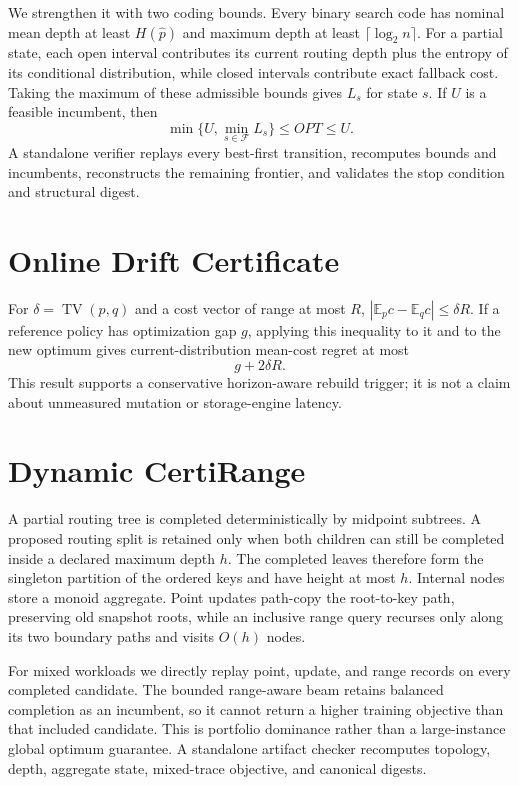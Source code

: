 \documentclass[10pt]{article}
\begin{document}
We strengthen it with two coding bounds. Every binary search code has nominal
mean depth at least $H(\hat p)$ and maximum depth at least
$\lceil\log_2 n\rceil$. For a partial state, each open interval contributes
its current routing depth plus the entropy of its conditional distribution,
while closed intervals contribute exact fallback cost. Taking the maximum of
these admissible bounds gives $L_s$ for state $s$. If $U$ is a feasible
incumbent, then
\[
\min\{U,\min_{s\in\mathcal F}L_s\}\leq OPT\leq U.
\]
A standalone verifier replays every best-first transition, recomputes bounds
and incumbents, reconstructs the remaining frontier, and validates the stop
condition and structural digest.

\section{Online Drift Certificate}
For $\delta=\operatorname{TV}(p,q)$ and a cost vector of range at most $R$,
$|\mathbb E_p c-\mathbb E_q c|\leq\delta R$. If a reference policy has
optimization gap $g$, applying this inequality to it and to the new optimum
gives current-distribution mean-cost regret at most
\[
g+2\delta R.
\]
This result supports a conservative horizon-aware rebuild trigger; it is not a
claim about unmeasured mutation or storage-engine latency.

\section{Dynamic CertiRange}
A partial routing tree is completed deterministically by midpoint subtrees.
A proposed routing split is retained only when both children can still be
completed inside a declared maximum depth $h$. The completed leaves therefore
form the singleton partition of the ordered keys and have height at most $h$.
Internal nodes store a monoid aggregate. Point updates path-copy the
root-to-key path, preserving old snapshot roots, while an inclusive range query
recurses only along its two boundary paths and visits $O(h)$ nodes.

For mixed workloads we directly replay point, update, and range records on
every completed candidate. The bounded range-aware beam retains balanced
completion as an incumbent, so it cannot return a higher training objective
than that included candidate. This is portfolio dominance rather than a
large-instance global optimum guarantee. A standalone artifact checker
recomputes topology, depth, aggregate state, mixed-trace objective, and
canonical digests.
\end{document}
